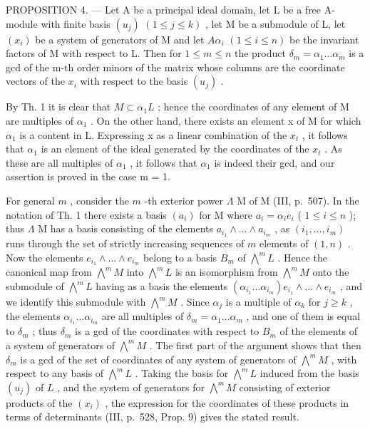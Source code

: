 PROPOSITION 4. --- Let A be a principal ideal domain, let L be a free A-module with finite basis \((u_{j})\) \((1 \leqslant j \leqslant k)\) , let M be a submodule of L, let \((x_{i})\) be a system of generators of M and let \(A\alpha_{i}\) \((1 \leqslant i \leqslant n)\) be the invariant factors of M with respect to L. Then for \(1 \leqslant m \leqslant n\) the product \(\delta_{m} = \alpha_{1} \ldots \alpha_{m}\) is a gcd of the m-th order minors of the matrix whose columns are the coordinate vectors of the \(x_{i}\) with respect to the basis \((u_{j})\) .

By Th. 1 it is clear that \(M \subset \alpha_{1}L\) ; hence the coordinates of any element of M are multiples of \(\alpha_{1}\) . On the other hand, there exists an element x of M for which \(\alpha_{1}\) is a content in L. Expressing x as a linear combination of the \(x_{t}\) , it follows that \(\alpha_{1}\) is an element of the ideal generated by the coordinates of the \(x_{t}\) . As these are all multiples of \(\alpha_{1}\) , it follows that \(\alpha_{1}\) is indeed their gcd, and our assertion is proved in the case m = 1.

For general \(m\) , consider the \(m\) -th exterior power \(\Lambda\) M of M (III, p.~507). In the notation of Th. 1 there exists a basis \((a_i)\) for M where \(a_i = \alpha_i e_i\) ( \(1 \leqslant i \leqslant n\) ); thus \(\Lambda\) M has a basis consisting of the elements \(a_{i_1} \wedge \ldots \wedge a_{i_m}\) , as \((i_1, \ldots, i_m)\) runs through the set of strictly increasing sequences of \(m\) elements of \((1, n)\) . Now the elements \(e_{i_1} \wedge \ldots \wedge e_{i_m}\) belong to a basis \(B_m\) of \(\bigwedge^m L\) . Hence the canonical map from \(\bigwedge^m M\) into \(\bigwedge^m L\) is an isomorphism from \(\bigwedge^m M\) onto the submodule of \(\bigwedge^m L\) having as a basis the elements \((\alpha_{i_1} \ldots \alpha_{i_m}) e_{i_1} \wedge \ldots \wedge e_{i_m}\) , and we identify this submodule with \(\bigwedge^m M\) . Since \(\alpha_j\) is a multiple of \(\alpha_k\) for \(j \geqslant k\) , the elements \(\alpha_{i_1} \ldots \alpha_{i_m}\) are all multiples of \(\delta_m = \alpha_1 \ldots \alpha_m\) , and one of them is equal to \(\delta_m\) ; thus \(\delta_m\) is a gcd of the coordinates with respect to \(B_m\) of the elements of a system of generators of \(\bigwedge^m M\) . The first part of the argument shows that then \(\delta_m\) is a gcd of the set of coordinates of any system of generators of \(\bigwedge^m M\) , with respect to any basis of \(\bigwedge^m L\) . Taking the basis for \(\bigwedge^m L\) induced from the basis \((u_j)\) of \(L\) , and the system of generators for \(\bigwedge^m M\) consisting of exterior products of the \((x_i)\) , the expression for the coordinates of these products in terms of determinants (III, p.~528, Prop. 9) gives the stated result.

